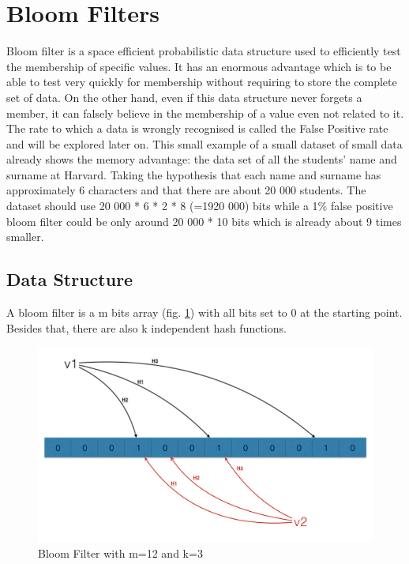 \documentclass{eplmastersthesis}
\begin{document}
\section{Bloom Filters}
Bloom filter is a space efficient probabilistic data structure  used to efficiently test the membership of specific values.
It has an enormous advantage which is to be able to test very quickly for membership without requiring to store the complete set of data. On the other hand, even if this data structure never forgets a member, it can falsely believe in the membership of a value even not related to it. The rate to which a data is wrongly recognised is called the False Positive rate and will be explored later on.
This small example of a small dataset of small data already shows the memory advantage: the data set of all the students' name and surname at Harvard. Taking the hypothesis that each name and surname has approximately 6 characters and that there are about 20 000 students. The dataset should use 20 000 * 6 * 2 * 8 (=1920 000) bits while a 1\% false positive bloom filter could be only around 20 000 * 10 bits which is already about 9 times smaller.\\

\subsection{Data Structure}
A bloom filter is a m bits array (fig. \ref{bloom-1}) with all bits set to 0 at the starting point. Besides that, there are also k independent hash functions. 

\begin{figure}[h!]
	\begin{center}
		\includegraphics[scale=0.3]{res/bloom-1}
		\caption{Bloom Filter with m=12 and k=3}
		\label{bloom-1}
	\end{center}
\end{figure}
\end{document}
